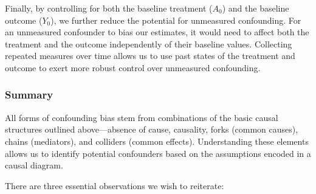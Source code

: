 \documentclass[
  singlecolumn]{article}
\begin{document}
Finally, by controlling for both the baseline treatment (\(A_0\)) and
the baseline outcome (\(Y_0\)), we further reduce the potential for
unmeasured confounding. For an unmeasured confounder to bias our
estimates, it would need to affect both the treatment and the outcome
independently of their baseline values. Collecting repeated measures
over time allows us to use past states of the treatment and outcome to
exert more robust control over unmeasured confounding.

\subsubsection{Summary}\label{summary-1}

All forms of confounding bias stem from combinations of the basic causal
structures outlined above---absence of cause, causality, forks (common
causes), chains (mediators), and colliders (common effects).
Understanding these elements allows us to identify potential confounders
based on the assumptions encoded in a causal diagram.

There are three essential observations we wish to reiterate:
\end{document}
